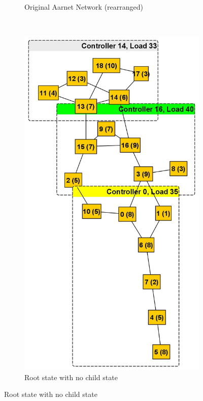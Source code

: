 \documentclass[final,5p,times]{cas-dc}
\begin{document}
\begin{figure}
\begin{subfigure}{0.3\textwidth}
			\caption{Original Aarnet Network (rearranged)}
			\label{fig:aarnet2009}
		\end{subfigure}
		~
		\begin{subfigure}{0.3\textwidth}
			\includegraphics[width=\linewidth]{Images/Aarnet_Load_1.jpg}
			\caption{Root state with no child state}
			\label{fig:aarnet2009l1}
		\end{subfigure}

\end{figure}
\end{document}
